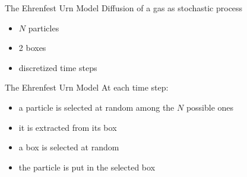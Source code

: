 \begin{frame}{The Ehrenfest Urn Model} %
    Diffusion of a gas as \alert{stochastic process}
    \begin{itemize}
      \item $N$ particles
      \item 2 boxes
      \item discretized time steps
    \end{itemize}
   
    \begin{figure}
      \begin{center}
        
      \end{center}
    \end{figure}

  \end{frame}

  \begin{frame}{The Ehrenfest Urn Model}
    At each time step:
    \begin{itemize}
      \item<1-> \alert<1>{a particle is selected at random among the $N$ possible ones}
      \item<2-> \alert<2>{it is extracted from its box}
      \item<3-> \alert<3>{a box is selected at random}
      \item<4-> \alert<4>{the particle is put in the selected box}
    \end{itemize}

    \medskip
        \begin{figure}[b]
        \begin{center}
        \end{center}
        \end{figure}
  \end{frame}

